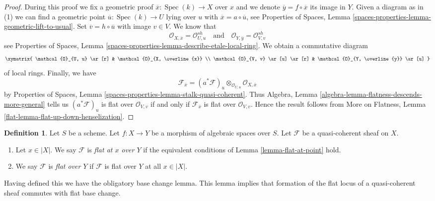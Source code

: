 \documentclass{stacks-project}
\theoremstyle{plain}
\theoremstyle{definition}
\newtheorem{definition}[subsection]{Definition}
\theoremstyle{remark}
\numberwithin{equation}{subsection}
\def\Spec{\mathop{\mathrm{Spec}}}
\begin{document}
\begin{proof}
During this proof we fix a geometric proof
$\overline{x} : \Spec(k) \to X$ over $x$ and
we denote $\overline{y} = f \circ \overline{x}$ its image in $Y$.
Given a diagram as in (1) we can find a geometric point
$\overline{u} : \Spec(k) \to U$ lying over $u$ with
$\overline{x} = a \circ \overline{u}$, see
Properties of Spaces, Lemma
\ref{spaces-properties-lemma-geometric-lift-to-usual}.
Set $\overline{v} = h \circ \overline{u}$ with image $v \in V$.
We know that
$$
\mathcal{O}_{X, \overline{x}} = \mathcal{O}_{U, u}^{sh}
\quad\text{and}\quad
\mathcal{O}_{Y, \overline{y}} = \mathcal{O}_{V, v}^{sh}
$$
see
Properties of Spaces, Lemma
\ref{spaces-properties-lemma-describe-etale-local-ring}.
We obtain a commutative diagram
$$
\xymatrix{
\mathcal{O}_{U, u} \ar[r] &
\mathcal{O}_{X, \overline{x}} \\
\mathcal{O}_{V, v} \ar[u] \ar[r] &
\mathcal{O}_{Y, \overline{y}} \ar[u]
}
$$
of local rings. Finally, we have
$$
\mathcal{F}_{\overline{x}} =
(a^*\mathcal{F})_u \otimes_{\mathcal{O}_{U, u}}
\mathcal{O}_{X, \overline{x}}
$$
by
Properties of Spaces, Lemma \ref{spaces-properties-lemma-stalk-quasi-coherent}.
Thus
Algebra, Lemma \ref{algebra-lemma-flatness-descends-more-general}
tells us $(a^*\mathcal{F})_u$ is flat over $\mathcal{O}_{V, v}$
if and only if $\mathcal{F}_{\overline{x}}$ is flat over $\mathcal{O}_{V, v}$.
Hence the result follows from
More on Flatness, Lemma \ref{flat-lemma-flat-up-down-henselization}.
\end{proof}

\begin{definition}
\label{definition-flat-module}
Let $S$ be a scheme.
Let $f : X \to Y$ be a morphism of algebraic spaces over $S$.
Let $\mathcal{F}$ be a quasi-coherent sheaf on $X$.
\begin{enumerate}
\item Let $x \in |X|$. We say $\mathcal{F}$ is {\it flat at $x$ over $Y$}
if the equivalent conditions of
Lemma \ref{lemma-flat-at-point}
hold.
\item We say $\mathcal{F}$ is {\it flat over $Y$} if $\mathcal{F}$ is
flat over $Y$ at all $x \in |X|$.
\end{enumerate}
\end{definition}

\noindent
Having defined this we have the obligatory base change lemma.
This lemma implies that formation of the flat locus of a quasi-coherent
sheaf commutes with flat base change.
\end{document}
